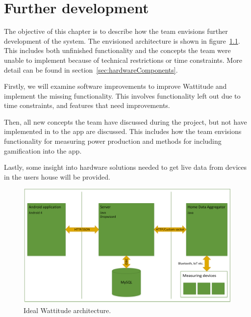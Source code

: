 \chapter{Further development}
\label{sec:further}
The objective of this chapter is to describe how the team envisions further development of the system. The envisioned architecture is shown in figure~\ref{fig:idealArchitecture}. This includes both unfinished functionality and the concepts the team were unable to implement because of technical restrictions or time constraints. More detail can be found in section~\ref{sec:hardwareComponents}.

Firstly, we will examine software improvements to improve Wattitude and implement the missing functionality. This involves functionality left out due to time constraints, and features that need improvements. 

Then, all new concepts the team have discussed during the project, but not have implemented in to the app are discussed. This includes how the team envisions functionality for measuring power production and methods for including gamification into the app. 

Lastly, some insight into hardware solutions needed to get live data from devices in the users house will be provided. 

\begin{figure}[H]
\centering
\includegraphics[height=0.3\textheight]{ch/further/fig/architecture.png}
\caption{Ideal Wattitude architecture.}
\label{fig:idealArchitecture}
\end{figure}




